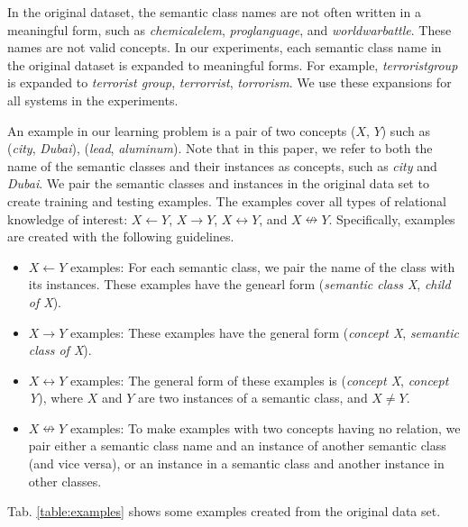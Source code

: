 In the original dataset, the semantic class names are not often
written in a meaningful form, such as {\em chemicalelem}, {\em
  proglanguage}, and {\em worldwarbattle}. These names are not valid
concepts. In our experiments, each semantic class name in the original
dataset is expanded to meaningful forms. For example, {\em
  terroristgroup} is expanded to {{\em terrorist group}, {\em
    terrorrist}, {\em torrorism}}. We use these expansions for all
systems in the experiments.


An example in our learning problem is a pair of two concepts ($X$,
$Y$) such as ({\em city}, {\em Dubai}), ({\em lead}, {\em
  aluminum}). Note that in this paper, we refer to both the name of
the semantic classes and their instances as concepts, such as {\em
  city} and {\em Dubai}. We pair the semantic classes and instances in
the original data set to create training and testing examples. The
examples cover all types of relational knowledge of interest: $X
\leftarrow Y$, $X \rightarrow Y$, $X \leftrightarrow Y$, and $X
\nleftrightarrow Y$. Specifically, examples are created with the
following guidelines.

\begin{itemize}
\item $X \leftarrow Y$ examples: For each semantic class, we pair the
  name of the class with its instances. These examples have the
  genearl form ({\em semantic class X}, {\em child of X}).
\item $X \rightarrow Y$ examples: These examples have the general form
  ({\em concept X}, {\em semantic class of X}).
\item $X \leftrightarrow Y$ examples: The general form of these
  examples is ({\em concept X}, {\em concept Y}), where $X$ and $Y$
  are two instances of a semantic class, and $X \ne Y$.
\item $X \nleftrightarrow Y$ examples: To make examples with two
  concepts having no relation, we pair either a semantic class name
  and an instance of another semantic class (and vice versa), or an
  instance in a semantic class and another instance in other classes.
\end{itemize}

Tab. \ref{table:examples} shows some examples created from the
original data set.

